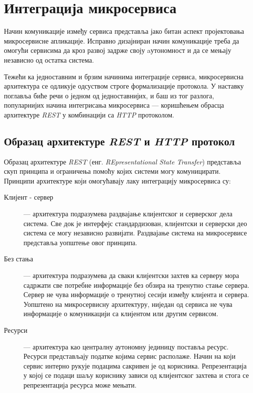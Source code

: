\documentclass[12pt,oneside]{memoir}
\begin{document}
\section{Интеграција микросервиса}

Начин комуникације између сервиса представља јако битан аспект пројектовања микросервисне апликације. Исправно дизајниран начин комуникације треба да омогући сервисима да кроз развој задрже своју aутономност и да се мењају независно од остатка система. 

Тежећи ка једноставним и брзим начинима интеграције сервиса, микросервисна архитектура се одликује одсуством строге формализације протокола. У наставку поглавља биће речи о једном од једноставнијих, и баш из тог разлога, популарнијих начина интегрисања микросервиса  --- коришћењем обрасца архитектуре \textit{REST}  у комбинацији са \textit{HTTP} протоколом.

\subsection{Образац архитектуре \textit{REST} и \textit{HTTP} протокол}

Образац архитектуре \textit{REST} (енг. \textit{REpresentational State Transfer}) представља скуп принципа и ограничења помоћу којих системи могу комуницирати. Принципи архитектуре који омогућавају лаку интеграцију микросервиса су:

\begin{description}
\item[Клијент - сервер]  --- архитектура подразумева раздвајање клијентског и серверског дела система. Све док је интерфејс стандардизован, клијентски и серверски део система се могу независно развијати. Раздвајање система на микросервисе представља уопштење овог принципа.
\item[Без стања] --- архитектура подразумева да сваки клијентски захтев ка серверу мора садржати све потребне информације без обзира на тренутно стање сервера. Сервер не чува информације о тренутној сесији између клијента и сервера. Уопштено на микросервисну архитектуру, ниједан од сервиса не чува информације о комуникацији са клијентом или другим сервисом.
\item[Ресурси] --- архитектура као централну аутономну јединицу поставља ресурс. Ресурси представљају податке којима сервис располаже. Начин на који сервис интерно рукује подацима сакривен је од корисника. Репрезентација у којој се подаци шаљу кориснику зависи од клијентског захтева и стога се репрезентација ресурса може мењати.
\end{description}
\end{document}
